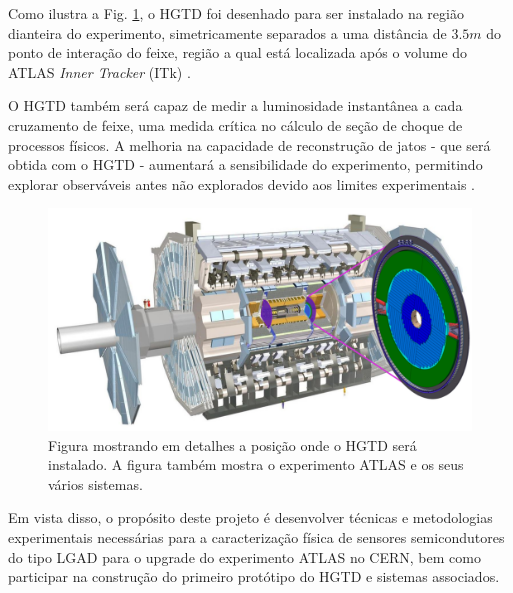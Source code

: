 Como ilustra a Fig. \ref{hgtd_atlas}, o HGTD foi desenhado para ser instalado na região dianteira do experimento, simetricamente separados a uma distância de $3.5m$ do ponto de interação do feixe, região a qual está localizada após o volume do ATLAS {\it Inner Tracker} (ITk) \cite{tdr}.

\thispagestyle{plain}
O HGTD também será capaz de medir a luminosidade instantânea a cada cruzamento de feixe, uma medida crítica no cálculo de seção de choque de processos físicos. A melhoria na capacidade de reconstrução de jatos - que será obtida com o HGTD - aumentará a sensibilidade do experimento, permitindo explorar observáveis antes não explorados devido aos limites experimentais \cite{tdr}.

\thispagestyle{plain}
\begin{figure} 
    \centering
    \includegraphics[width=15.0cm]{assets/ATLAS_HGTD.png}
    \caption{ Figura mostrando em detalhes a posição onde o HGTD será instalado. A figura também mostra o experimento ATLAS e os seus vários sistemas.}
    \label{hgtd_atlas}
\end{figure}

Em vista disso, o propósito deste projeto é desenvolver técnicas e metodologias experimentais necessárias para a caracterização física de sensores semicondutores do tipo LGAD para o upgrade do experimento ATLAS no CERN, bem como participar na construção do primeiro protótipo do HGTD e sistemas associados.

